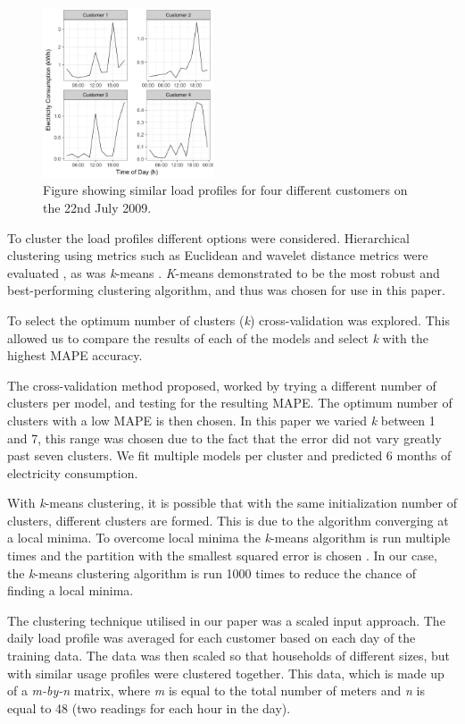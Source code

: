 \begin{figure}[b]
	\includegraphics[width=0.45\textwidth]{Chapter5/figures/similar_cust.png}
	\caption{Figure showing similar load profiles for four different customers on the 22nd July 2009.}
	\label{fig:similar_customers}
\end{figure}

To cluster the load profiles different options were considered. Hierarchical clustering using metrics such as Euclidean and wavelet distance metrics were evaluated \cite{BIMJ:BIMJ4710240520}, as was \textit{k}-means \cite{Forgy65}.\textit{ K}-means demonstrated to be the most robust and best-performing clustering algorithm, and thus was chosen for use in this paper.

To select the optimum number of clusters (\textit{k}) cross-validation was explored. This allowed us to compare the results of each of the models and select \textit{k} with the highest MAPE accuracy.

The cross-validation method proposed, worked by trying a different number of clusters per model, and testing for the resulting MAPE. The optimum number of clusters with a low MAPE is then chosen. In this paper we varied \textit{k} between 1 and 7, this range was chosen due to the fact that the error did not vary greatly past seven clusters. We fit multiple models per cluster and predicted 6 months of electricity consumption.

With \textit{k}-means clustering, it is possible that with the same initialization number of clusters, different clusters are formed. This is due to the algorithm converging at a local minima. To overcome local minima the \textit{k}-means algorithm is run multiple times and the partition with the smallest squared error is chosen \cite{Jain2010}. In our case, the \textit{k}-means clustering algorithm is run 1000 times to reduce the chance of finding a local minima. 

The clustering technique utilised in our paper was a scaled input approach. The daily load profile was averaged for each customer based on each day of the training data. The data was then scaled so that households of different sizes, but with similar usage profiles were clustered together. This data, which is made up of a \textit{m-by-n} matrix, where \textit{m} is equal to the total number of meters and \textit{n} is equal to 48 (two readings for each hour in the day).

